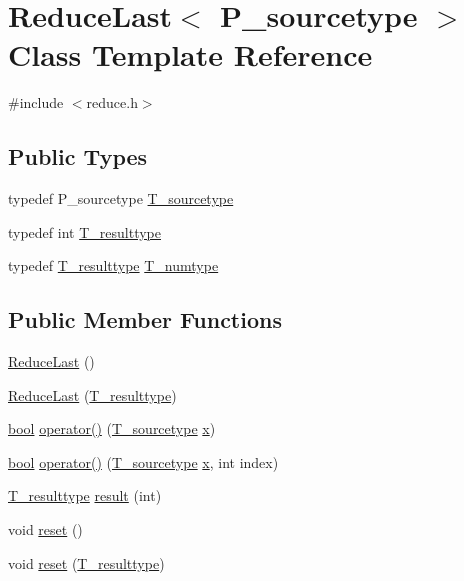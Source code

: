 \hypertarget{classReduceLast}{}\section{Reduce\+Last$<$ P\+\_\+sourcetype $>$ Class Template Reference}
\label{classReduceLast}


{\ttfamily \#include $<$reduce.\+h$>$}

\subsection*{Public Types}
\begin{DoxyCompactItemize}
\item 
typedef P\+\_\+sourcetype \hyperlink{classReduceLast_ab31d92dccc2dc7f98a31c40f1aa10f2f}{T\+\_\+sourcetype}
\item 
typedef int \hyperlink{classReduceLast_a173360092022caa3c428ac7bdca8c9dd}{T\+\_\+resulttype}
\item 
typedef \hyperlink{classReduceLast_a173360092022caa3c428ac7bdca8c9dd}{T\+\_\+resulttype} \hyperlink{classReduceLast_adf839b2684ce133fbf40e7e07f0e0708}{T\+\_\+numtype}
\end{DoxyCompactItemize}
\subsection*{Public Member Functions}
\begin{DoxyCompactItemize}
\item 
\hyperlink{classReduceLast_a78d8c242a9e9d830dbac414ab215aaf7}{Reduce\+Last} ()
\item 
\hyperlink{classReduceLast_a82b053828380a6e6e0d1d7755f58fdb4}{Reduce\+Last} (\hyperlink{classReduceLast_a173360092022caa3c428ac7bdca8c9dd}{T\+\_\+resulttype})
\item 
\hyperlink{compiler_8h_abb452686968e48b67397da5f97445f5b}{bool} \hyperlink{classReduceLast_a02b0e16e9cf13a73bb328fa8e4e8ca44}{operator()} (\hyperlink{classReduceLast_ab31d92dccc2dc7f98a31c40f1aa10f2f}{T\+\_\+sourcetype} \hyperlink{vecnorm1_8cc_ac73eed9e41ec09d58f112f06c2d6cb63}{x})
\item 
\hyperlink{compiler_8h_abb452686968e48b67397da5f97445f5b}{bool} \hyperlink{classReduceLast_a217b57335c8981f359b65bd23a614092}{operator()} (\hyperlink{classReduceLast_ab31d92dccc2dc7f98a31c40f1aa10f2f}{T\+\_\+sourcetype} \hyperlink{vecnorm1_8cc_ac73eed9e41ec09d58f112f06c2d6cb63}{x}, int index)
\item 
\hyperlink{classReduceLast_a173360092022caa3c428ac7bdca8c9dd}{T\+\_\+resulttype} \hyperlink{classReduceLast_a0e585afd7bc0f593898cd7412c54865a}{result} (int)
\item 
void \hyperlink{classReduceLast_a50b9eb0fbfb47311b8b94db17cc674e6}{reset} ()
\item 
void \hyperlink{classReduceLast_ac5b822cc2ade003bad6b87eed708d75c}{reset} (\hyperlink{classReduceLast_a173360092022caa3c428ac7bdca8c9dd}{T\+\_\+resulttype})
\end{DoxyCompactItemize}
